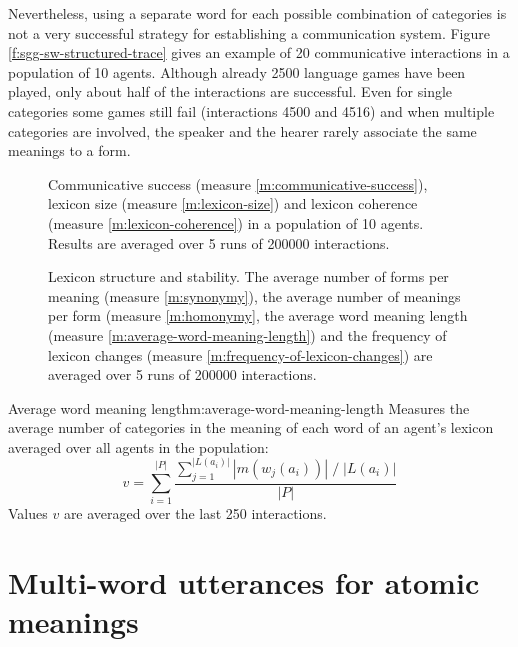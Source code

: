 \noindent Nevertheless, using a separate word for each possible
combination of categories is not a very successful strategy for
establishing a communication system. Figure
\ref{f:sgg-sw-structured-trace} gives an example of 20 communicative
interactions in a population of 10 agents. Although already 2500
language games have been played, only about half of the interactions
are successful. Even for single categories some games still fail
(interactions 4500 and 4516) and when multiple categories are
involved, the speaker and the hearer rarely associate the same
meanings to a form.

\begin{figure}[t]
  \caption{Communi\-cative success (measure
    \ref{m:communicative-success}), lexicon size (measure
    \ref{m:lexicon-size}) and lexicon coherence (measure
    \ref{m:lexicon-coherence}) in a population of 10 agents. Results
    are averaged over 5 runs of 200000 interactions.}
  \label{f:sgg-sw-structured-best-best-success+lexicon-size}
\end{figure}

\begin{figure}[t]
  \caption{Lexicon structure and stability. The average number of
    forms per meaning (measure \ref{m:synonymy}), the average number
    of meanings per form (measure \ref{m:homonymy}, the average word
    meaning length (measure \ref{m:average-word-meaning-length}) and
    the frequency of lexicon changes (measure
    \ref{m:frequency-of-lexicon-changes}) are averaged over 5 runs of
    200000 interactions.}
  \label{f:sgg-sw-structured-best-best-lexicon-structure}
\end{figure}


\begin{measure}[b]{Average word meaning length}{m:average-word-meaning-length}
  Measures the average number of categories in the meaning of each
  word of an agent's lexicon averaged over all agents in the
  population:
  $$v=\sum_{i=1}^{|P|}\frac{\sum_{j=1}^{|L(a_i)|}|m(w_j(a_i))|\;/\;|L(a_i)|}{|P|}$$
  Values $v$ are averaged over the last 250 interactions.
\end{measure}


\section{Multi-word utterances for atomic meanings}
\label{s:sgg-mw-unstructured}


